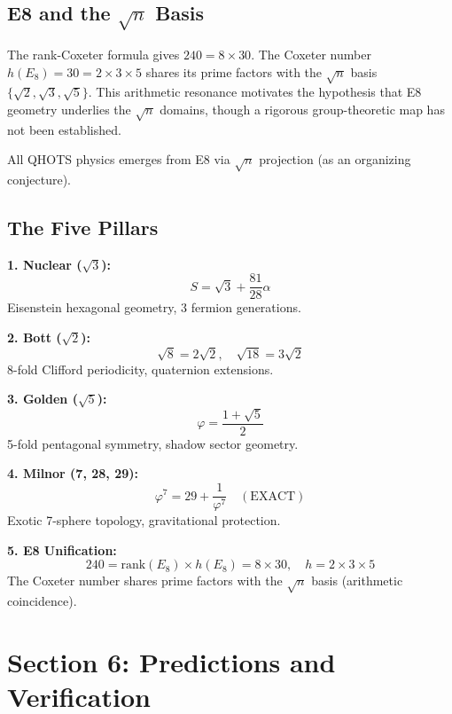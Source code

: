 \documentclass[aps,prd,twocolumn,superscriptaddress,floatfix,nofootinbib]{revtex4-2}
\theoremstyle{definition}
\theoremstyle{remark}
\newcommand{\vp}{\varphi}
\begin{document}
\subsection{E8 and the $\sqrt{n}$ Basis}

The rank-Coxeter formula gives $240 = 8 \times 30$. The Coxeter number $h(E_8) = 30 = 2 \times 3 \times 5$
shares its prime factors with the $\sqrt{n}$ basis $\{\sqrt{2}, \sqrt{3}, \sqrt{5}\}$.
This arithmetic resonance motivates the hypothesis that E8 geometry underlies the $\sqrt{n}$
domains, though a rigorous group-theoretic map has not been established.

All QHOTS physics emerges from E8 via $\sqrt{n}$ projection (as an organizing conjecture).

\subsection{The Five Pillars}

\textbf{1. Nuclear ($\sqrt{3}$):}
\begin{equation}
S = \sqrt{3} + \frac{81}{28}\alpha
\end{equation}
Eisenstein hexagonal geometry, 3 fermion generations.

\textbf{2. Bott ($\sqrt{2}$):}
\begin{equation}
\sqrt{8} = 2\sqrt{2}, \quad \sqrt{18} = 3\sqrt{2}
\end{equation}
8-fold Clifford periodicity, quaternion extensions.

\textbf{3. Golden ($\sqrt{5}$):}
\begin{equation}
\vp = \frac{1 + \sqrt{5}}{2}
\end{equation}
5-fold pentagonal symmetry, shadow sector geometry.

\textbf{4. Milnor (7, 28, 29):}
\begin{equation}
\vp^7 = 29 + \frac{1}{\vp^7} \quad (\text{EXACT})
\end{equation}
Exotic 7-sphere topology, gravitational protection.

\textbf{5. E8 Unification:}
\begin{equation}
240 = \mathrm{rank}(E_8) \times h(E_8) = 8 \times 30, \quad h = 2 \times 3 \times 5
\end{equation}
The Coxeter number shares prime factors with the $\sqrt{n}$ basis (arithmetic coincidence).

\section{Section 6: Predictions and Verification}
\end{document}
